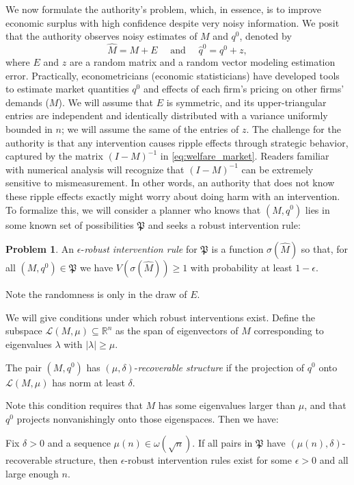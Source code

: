 \documentclass{notices}
\theoremstyle{definition}\newtheorem{problem}{Problem}
\begin{document}
We now formulate the authority's problem, which, in essence, is to improve economic surplus with high confidence despite very noisy information. We posit that the authority observes noisy estimates of \( M \) and $q^0$, denoted by $$ \widehat{M} = M + E \quad \text{ and } \quad  \widehat{q}^0 = q^0 + z,$$ where \( E \) and $z$ are a random matrix and a random vector modeling estimation error. Practically, econometricians (economic statisticians) have developed tools to estimate market quantities $q^0$ and effects of each firm's pricing on other firms' demands ($M$). We will assume that $E$ is symmetric, and its upper-triangular entries are independent and identically distributed with a variance uniformly bounded in $n$; we will assume the same of the entries of $z$. The challenge  for the authority is that any intervention causes ripple effects through strategic behavior, captured by the matrix $(I-M)^{-1}$ in \cref{eq:welfare_market}. Readers familiar with numerical analysis will recognize that $(I-M)^{-1}$ can be extremely sensitive to mismeasurement. In other words, an authority that does not know these ripple effects exactly might worry about doing harm with an intervention. To formalize this, we will consider a planner who knows that $(M,q^0)$ lies in some known set of possibilities $\mathfrak{P}$ and seeks a robust intervention rule:
\begin{problem} An $\epsilon$-\emph{robust intervention rule} for $\mathfrak{P}$ is a function $\sigma(\widehat{M})$ so that, for all $(M,q^0) \in \mathfrak{P}$ we have $V(\sigma(\widehat{M})) \geq 1$ with probability at least $1-\epsilon$. \end{problem}

Note the randomness is only in the draw of $E$. 

We will give conditions under which robust interventions exist. Define the subspace \( \mathcal{L}(M, \mu) \subseteq \mathbb{R}^n \) as the span of eigenvectors of \( M \) corresponding to eigenvalues \( \lambda \) with \( |\lambda| \geq \mu \).
\begin{definition} The pair $(M,q^0)$ has \( (\mu, \delta) \)-\emph{recoverable structure} if the projection of \( q^0 \) onto \( \mathcal{L}(M, \mu) \)  has norm at least $\delta$.\end{definition} Note this condition requires that $M$ has some eigenvalues larger than $\mu$, and that $q^0$ projects nonvanishingly onto those eigenspaces.
Then we have:
\begin{prop}
  Fix $\delta>0$ and a sequence $\mu(n) \in \omega(\sqrt{n})$. If all pairs in $\mathfrak{P}$ have  \( (\mu(n), \delta) \)-recoverable structure, then $\epsilon$-robust intervention rules exist for some $\epsilon>0$ and all large enough $n$.  
\end{prop}
\end{document}
